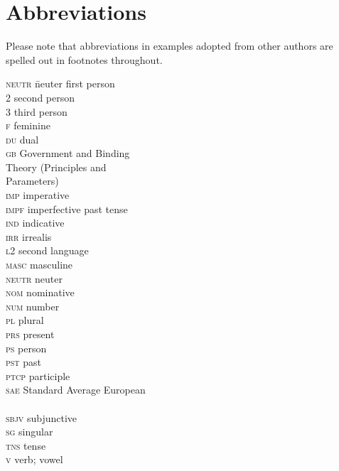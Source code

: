 \documentclass[output=paper]{langsci/langscibook}
\begin{document}
\section*{Abbreviations}
\begin{sloppypar}
Please note that abbreviations in examples adopted from other authors are spelled out in footnotes throughout.
\end{sloppypar}

\begin{multicols}{2}
\begin{tabbing}
\textsc{neutr} \hspace{1ex} \= neuter  \> first person \\
2 \> second person \\
3 \> third person \\
\textsc{f} \> feminine \\
\textsc{du} \> dual \\
\textsc{gb} \> Government and Binding \\ \> Theory (Principles and \\ \> Parameters) \\
\textsc{imp} \> imperative \\
\textsc{impf} \> imperfective past tense \\
\textsc{ind} \> indicative \\
\textsc{irr} \> irrealis \\
\textsc{l2} \> second language \\
\textsc{masc} \> masculine \\
\textsc{neutr} \> neuter \\
\textsc{nom} \> nominative \\
\textsc{num} \> number \\
\textsc{pl} \> plural \\
\textsc{prs} \> present \\
\textsc{ps} \> person \\
\textsc{pst} \> past \\
\textsc{ptcp} \> participle \\
\textsc{sae} \> Standard Average European \\ \> \citep{Haspelmath2001} \\
\textsc{sbjv} \> subjunctive \\
\textsc{sg} \> singular \\
\textsc{tns} \> tense \\
\textsc{v} \> verb; vowel
\end{tabbing}
\end{multicols}

{\sloppy\printbibliography[heading=subbibliography,notkeyword=this]}
\end{document}
